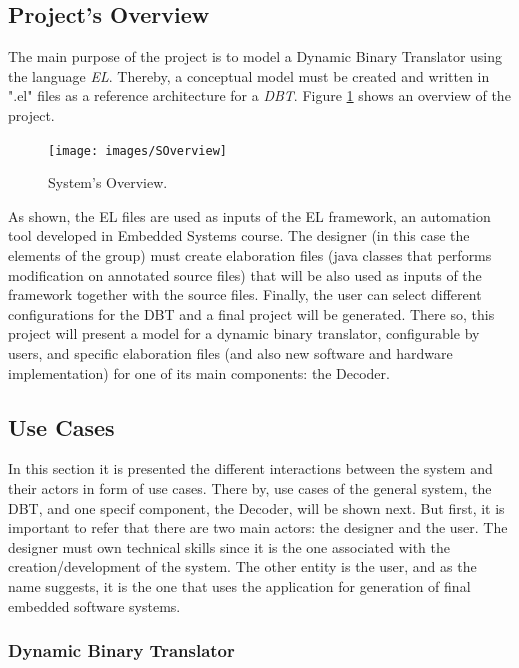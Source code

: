 \documentclass[12pt]{article}
\begin{document}
{%
\subsection{Project's Overview}
The main purpose of the project is to model a Dynamic Binary Translator using the language \textit{EL}. Thereby, a conceptual model must be created and written in ".el" files as a reference architecture for a \textit{DBT}. Figure \ref{fig:SOverview} shows an overview of the project.

\begin{figure}[!htb]
\centering
\texttt{[image: images/SOverview]}
\caption{System's Overview.}
\label{fig:SOverview} 
\end{figure}

As shown, the EL files are used as inputs of the EL framework, an automation tool developed in Embedded Systems course. The designer (in this case the elements of the group) must create elaboration files (java classes that performs modification on annotated source files) that will be also used as inputs of the framework together with the source files. Finally, the user can select different configurations for the DBT and a final project will be generated.
There so, this project will present a model for a dynamic binary translator, configurable by users, and specific elaboration files (and also new software and hardware implementation) for one of its main components: the Decoder.



\subsection{Use Cases}
In this section it is presented the different interactions between the system and their actors in form of use cases. There by, use cases of the general system, the DBT, and one specif component, the Decoder, will be shown next. But first, it is important to refer that there are two main actors: the designer and the user. The designer must own technical skills since it is the one associated with the creation/development of the system. The other entity is the user, and as the name suggests, it is the one that uses the application for generation of final embedded software systems.


\subsubsection{Dynamic Binary Translator}

}
\end{document}
